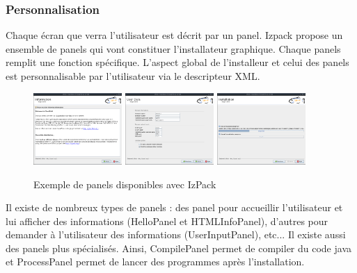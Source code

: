 \subsubsection{Personnalisation}
Chaque écran que verra l'utilisateur est décrit par un panel.
Izpack propose un ensemble de panels qui vont constituer l'installateur graphique.
Chaque panels remplit une fonction spécifique. L'aspect global de l'installeur et celui des panels est personnalisable par l'utilisateur via le descripteur XML.
\begin{figure}[H]
	\centering
	\includegraphics[width=0.3\textwidth]{../dia/included/install/02.png}
	\includegraphics[width=0.3\textwidth]{../dia/included/install/05.png}
	\includegraphics[width=0.3\textwidth]{../dia/included/install/06.png}
	\caption{Exemple de panels disponibles avec IzPack}
\end{figure}
Il existe de nombreux types de panels : des panel pour accueillir l'utilisateur et lui afficher des informations (HelloPanel et HTMLInfoPanel), d'autres pour demander à l'utilisateur des informations (UserInputPanel), etc...
Il existe aussi des panels plus spécialisés. Ainsi, CompilePanel permet de compiler du code java et ProcessPanel permet de lancer des programmes après l'installation.

